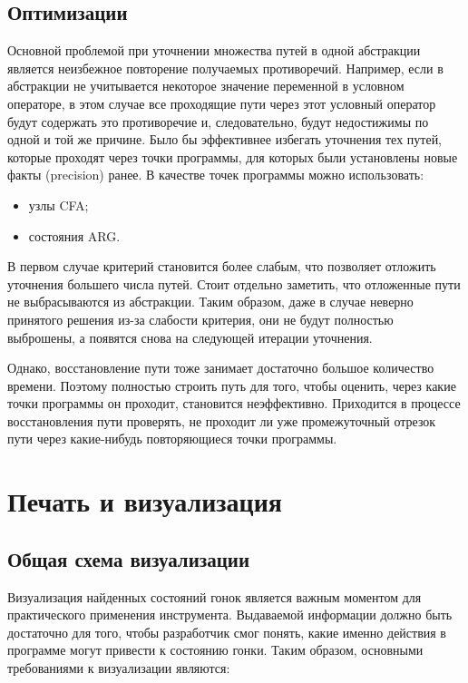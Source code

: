 \subsection{Оптимизации}

Основной проблемой при уточнении множества путей в одной абстракции является неизбежное повторение получаемых противоречий.
Например, если в абстракции не учитывается некоторое значение переменной в условном операторе, в этом случае все проходящие пути через этот условный оператор будут содержать это противоречие и, следовательно, будут недостижимы по одной и той же причине.
Было бы эффективнее избегать уточнения тех путей, которые проходят через точки программы, для которых были установлены новые факты (precision) ранее.
В качестве точек программы можно использовать:

\begin{itemize}
\item узлы CFA;
\item состояния ARG.
\end{itemize}

В первом случае критерий становится более слабым, что позволяет отложить уточнения большего числа путей.
Стоит отдельно заметить, что отложенные пути не выбрасываются из абстракции.
Таким образом, даже в случае неверно принятого решения из-за слабости критерия, они не будут полностью выброшены, а появятся снова на следующей итерации уточнения.

Однако, восстановление пути тоже занимает достаточно большое количество времени.
Поэтому полностью строить путь для того, чтобы оценить, через какие точки программы он проходит, становится неэффективно.
Приходится в процессе восстановления пути проверять, не проходит ли уже промежуточный отрезок пути через какие-нибудь повторяющиеся точки программы.

\section{Печать и визуализация} \label{sect_impl_visualization}

\subsection{Общая схема визуализации}
Визуализация найденных состояний гонок является важным моментом для практического применения инструмента.
Выдаваемой информации должно быть достаточно для того, чтобы разработчик смог понять, какие именно действия в программе могут привести к состоянию гонки.
Таким образом, основными требованиями к визуализации являются:

